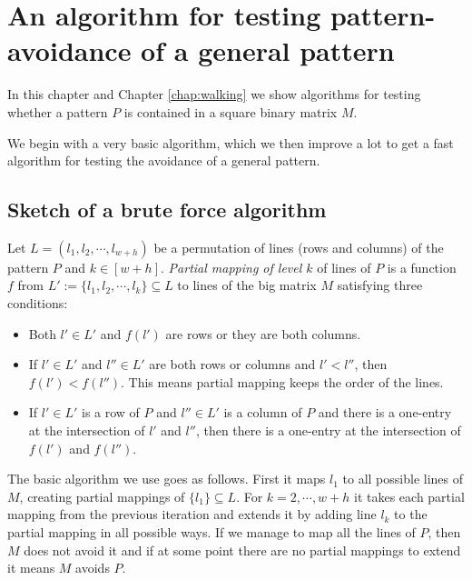 \chapter{An algorithm for testing pattern-avoidance of a general pattern}
\label{chap:general}
In this chapter and Chapter \ref{chap:walking} we show algorithms for testing whether a pattern $P$ is contained in a square binary matrix $M$.

We begin with a very basic algorithm, which we then improve a lot to get a fast algorithm for testing the avoidance of a general pattern.

\section{Sketch of a brute force algorithm}
Let $L=(l_1,l_2,\cdots,l_{w+h})$ be a permutation of lines (rows and columns) of the pattern $P$ and $k\in[w+h]$. \emph{Partial mapping of level $k$} of lines of $P$ is a function $f$ from $L':=\{l_1,l_2,\cdots,l_k\}\subseteq L$ to lines of the big matrix $M$ satisfying three conditions: 
\begin{itemize}
\item Both $l'\in L'$ and $f(l')$ are rows or they are both columns.
\item If $l'\in L'$ and $l''\in L'$ are both rows or columns and $l'<l''$, then $f(l')<f(l'')$. This means partial mapping keeps the order of the lines.
\item If $l'\in L'$ is a row of $P$ and $l''\in L'$ is a column of $P$ and there is a one-entry at the intersection of $l'$ and $l''$, then there is a one-entry at the intersection of $f(l')$ and $f(l'')$.
\end{itemize}
The basic algorithm we use goes as follows. First it maps $l_1$ to all possible lines of $M$, creating partial mappings of $\{l_1\}\subseteq L$. For $k=2,\cdots,w+h$ it takes each partial mapping from the previous iteration and extends it by adding line $l_k$ to the partial mapping in all possible ways. If we manage to map all the lines of $P$, then $M$ does not avoid it and if at some point there are no partial mappings to extend it means $M$ avoids $P$.

